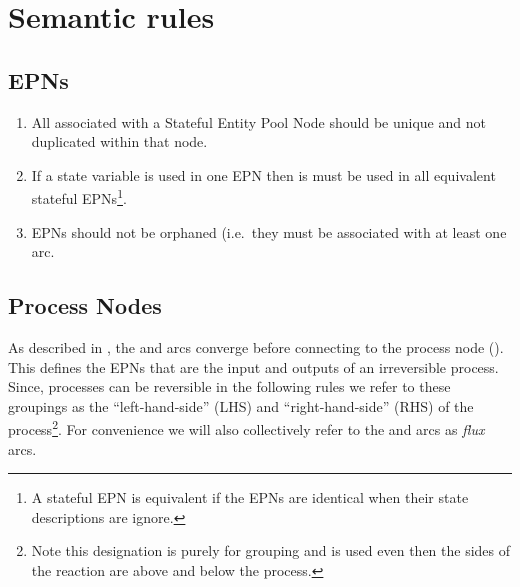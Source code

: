 \section{Semantic rules}

\subsection{EPNs}

 \begin{enumerate}
   \item All  associated with a Stateful Entity Pool Node should be unique and not duplicated within that node.
   \item If a state variable is used in one EPN then is must be used in all equivalent stateful EPNs\footnote{A stateful EPN is equivalent if the EPNs are identical when their state descriptions are ignore.}.
   \item EPNs should not be orphaned (i.e.\, they must be associated with at least one arc.
 \end{enumerate}

\subsection{Process Nodes}

As described in , the  and  arcs converge before connecting to the process node (). This defines the EPNs that are the input and outputs of an irreversible process. Since, processes can be reversible in the following rules we refer to these groupings as the ``left-hand-side'' (LHS) and ``right-hand-side'' (RHS) of the process\footnote{Note this designation is purely for grouping and is used even then the sides of the reaction are above and below the process.}. For convenience we will also collectively refer to the  and  arcs as \emph{flux} arcs.

